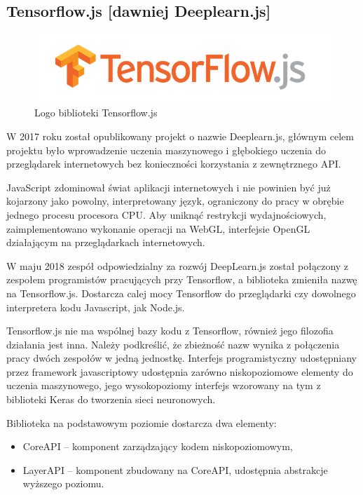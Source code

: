 \documentclass[12pt,a4paper,twoside,titlepage,openright]{book}
\begin{document}
\begin{itemize}
\begin{itemize}
\subsection{Tensorflow.js [dawniej Deeplearn.js]}
\begin{figure}[ht]
	\centering
			\includegraphics[resolution=100, scale=0.6]{TensorflowJS.png}
		\caption{Logo biblioteki Tensorflow.js}
\end{figure}

W 2017 roku został opublikowany projekt o nazwie Deeplearn.js, głównym celem projektu było wprowadzenie uczenia maszynowego i głębokiego uczenia do przeglądarek internetowych bez konieczności korzystania z zewnętrznego API.

JavaScript zdominował świat aplikacji internetowych i nie powinien być już kojarzony jako powolny, interpretowany język, ograniczony do pracy w obrębie jednego procesu procesora CPU. \cite{siteSlowJavaScript} Aby uniknąć restrykcji wydajnościowych, zaimplementowano wykonanie operacji na WebGL, interfejsie OpenGL działającym na przeglądarkach internetowych.

W maju 2018 zespół odpowiedzialny za rozwój DeepLearn.js został połączony z zespołem programistów pracujących przy Tensorflow, a biblioteka zmieniła nazwę na Tensorflow.js. Dostarcza calej mocy Tensorflow do przeglądarki czy dowolnego interpretera kodu Javascript, jak Node.js.

Tensorflow.js nie ma wspólnej bazy kodu z Tensorflow, również jego filozofia działania jest inna. Należy podkreślić, że zbieżność nazw wynika z połączenia pracy dwóch zespołów w jedną jednostkę. Interfejs programistyczny udostępniany przez framework javascriptowy udostępnia zarówno niskopoziomowe elementy do uczenia maszynowego, jego wysokopoziomy interfejs wzorowany na tym z biblioteki Keras do tworzenia sieci neuronowych.

Biblioteka na podstawowym poziomie dostarcza dwa elementy:
\begin{itemize}
\item CoreAPI -- komponent zarządzający kodem niskopoziomowym,
\item LayerAPI -- komponent zbudowany na CoreAPI, udostępnia abstrakcje wyższego poziomu.
\end{itemize}


\end{itemize}
\end{itemize}
\end{document}
